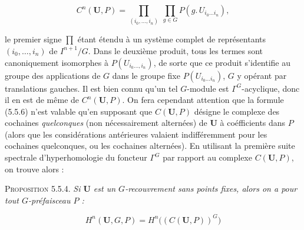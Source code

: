 \[
\tag{5.5.6}
C^n({\mathbf U},P)=
\prod_{(i_0,\ldots,i_n)}\ \prod_{g\in G}
P(g.\, U_{i_0\ldots i_n}),
\]

le premier signe $\displaystyle\prod$ étant étendu à un système complet de représentants
$(i_0,\ldots,i_n)$ de $I^{n+1}/G$. Dans le deuxième produit, tous les termes
sont canoniquement isomorphes à $P(U_{i_0\ldots,i_n})$, de sorte que ce produit
s'identifie au groupe des applications de $G$ dans le groupe fixe
$P(U_{i_0\ldots i_n})$, $G$ y opérant par translations gauches. Il est bien
connu qu'un tel $G$-module est $\Gamma^G$-acyclique, donc il en est de même de
$C^n({\mathbf U},P)$. On fera cependant attention que la formule (5.5.6) n'est
valable qu'en supposant que $C({\mathbf U},P)$ désigne le complexe des cochaines
\emph{quelconques} (non nécessairement alternées) de ${\mathbf U}$ à coéfficients dans
$P$ (alors que les considérations antérieures valaient indifféremment pour les
cochaines quelconques, ou les cochaines alternées). En utilisant la première
suite spectrale d'hyperhomologie du foncteur $\Gamma^G$ par rapport au complexe
$C({\mathbf U},P)$, on trouve alors :

\textsc{Proposition 5.5.4.} \textit{Si ${\mathbf U}$ est un
$G$-recouvrement sans points fixes, alors on a pour tout $G$-préfaisceau $P$ :}

\[
\tag{5.5.7}
H^n({\mathbf U},G,P)=H^n\bigl((C({\mathbf U},P))^G\bigr)
\]

